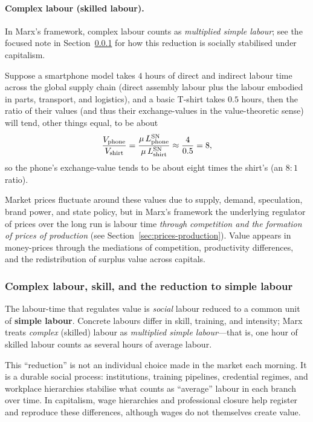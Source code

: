 \paragraph{Complex labour (skilled labour).}
In Marx’s framework, complex labour counts as \emph{multiplied simple labour}; see the focused note in
Section~\ref{sec:complex-labour-note} for how this reduction is socially stabilised under capitalism.


Suppose a smartphone model takes $4$ hours of direct and indirect labour
time across the global supply chain (direct assembly labour plus the labour embodied in
parts, transport, and logistics), and a basic T-shirt takes $0.5$ hours, then the ratio
of their values (and thus their exchange-values in the value-theoretic sense) will tend,
other things equal, to be about
\[
  \frac{V_{\text{phone}}}{V_{\text{shirt}}}
  = \frac{\mu\,L^{\mathrm{SN}}_{\text{phone}}}{\mu\,L^{\mathrm{SN}}_{\text{shirt}}}
  \approx \frac{4}{0.5} = 8,
\]
so the phone’s exchange-value tends to be about eight times the shirt’s (an $8{:}1$ ratio).

Market prices fluctuate around these values due to supply, demand, speculation, brand
power, and state policy, but in Marx's framework the underlying regulator of prices over
the long run is labour time \emph{through competition and the formation of prices of production} (see Section~\ref{sec:prices-production}).
Value appears in money-prices through the mediations of competition, productivity
differences, and the redistribution of surplus value across capitals.

\subsubsection{Complex labour, skill, and the reduction to simple labour}
\label{sec:complex-labour-note}

The labour-time that regulates value is \emph{social} labour reduced to a common
unit of \textbf{simple labour}. Concrete labours differ in
skill, training, and intensity; Marx treats \emph{complex} (skilled) labour as
\emph{multiplied simple labour}---that is, one hour of skilled labour counts as several
hours of average labour.\cite{Marx1867}

This ``reduction'' is not an individual choice made in the market each morning. It is a
durable social process: institutions, training pipelines, credential regimes, and workplace
hierarchies stabilise what counts as ``average'' labour in each branch over time. In capitalism, wage hierarchies and professional closure help register and
reproduce these differences, although wages do not themselves create value.\cite{Foley1986,Shaikh2016}

